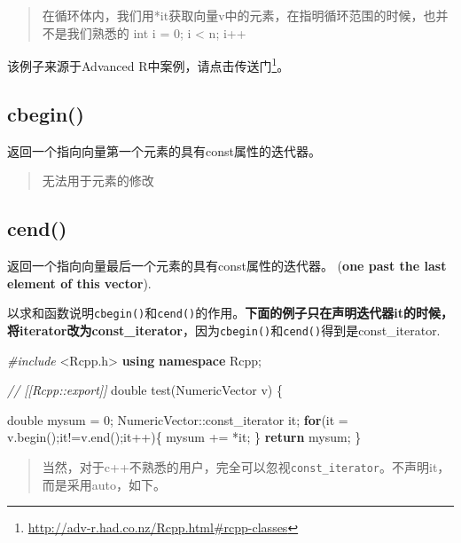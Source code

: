 \documentclass[]{ctexbook}
\newenvironment{Shaded}{\begin{snugshade}}{\end{snugshade}}
\newcommand{\KeywordTok}[1]{\textcolor[rgb]{0.13,0.29,0.53}{\textbf{#1}}}
\newcommand{\DataTypeTok}[1]{\textcolor[rgb]{0.13,0.29,0.53}{#1}}
\newcommand{\DecValTok}[1]{\textcolor[rgb]{0.00,0.00,0.81}{#1}}
\newcommand{\ImportTok}[1]{#1}
\newcommand{\CommentTok}[1]{\textcolor[rgb]{0.56,0.35,0.01}{\textit{#1}}}
\newcommand{\ControlFlowTok}[1]{\textcolor[rgb]{0.13,0.29,0.53}{\textbf{#1}}}
\newcommand{\PreprocessorTok}[1]{\textcolor[rgb]{0.56,0.35,0.01}{\textit{#1}}}
\newcommand{\NormalTok}[1]{#1}
\renewcommand{\href}[2]{#2\footnote{\url{#1}}}
\begin{document}
\begin{quote}
在循环体内，我们用*it获取向量v中的元素，在指明循环范围的时候，也并不是我们熟悉的
int i = 0; i \textless{} n; i++
\end{quote}

该例子来源于Advanced
R中案例，请点击\href{http://adv-r.had.co.nz/Rcpp.html\#rcpp-classes}{传送门}。

\subsection{cbegin()}\label{cbegin}

返回一个指向向量第一个元素的具有const属性的迭代器。

\begin{quote}
无法用于元素的修改
\end{quote}

\subsection{cend()}\label{cend}

返回一个指向向量最后一个元素的具有const属性的迭代器。 (\textbf{one past
the last element of this vector}).

以求和函数说明\texttt{cbegin()}和\texttt{cend()}的作用。\textbf{下面的例子只在声明迭代器it的时候，将iterator改为const\_iterator}，因为\texttt{cbegin()}和\texttt{cend()}得到是const\_iterator.

\begin{Shaded}
\begin{Highlighting}[]
\PreprocessorTok{#include }\ImportTok{<Rcpp.h>}
\KeywordTok{using} \KeywordTok{namespace}\NormalTok{ Rcpp;}

\CommentTok{// [[Rcpp::export]]}
\DataTypeTok{double}\NormalTok{ test(NumericVector v) \{}
  
  \DataTypeTok{double}\NormalTok{ mysum = }\DecValTok{0}\NormalTok{;}
\NormalTok{  NumericVector::const_iterator it;}
  \ControlFlowTok{for}\NormalTok{(it = v.begin();it!=v.end();it++)\{}
\NormalTok{    mysum += *it;}
\NormalTok{  \}}
  \ControlFlowTok{return}\NormalTok{ mysum;}
\NormalTok{\}}
\end{Highlighting}
\end{Shaded}

\begin{quote}
当然，对于c++不熟悉的用户，完全可以忽视\texttt{const\_iterator}。不声明it，而是采用auto，如下。
\end{quote}
\end{document}
